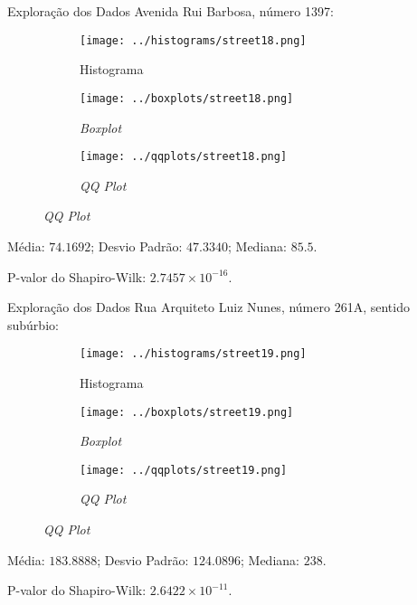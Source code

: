 \begin{frame}{Exploração dos Dados}
Avenida Rui Barbosa, número 1397:
\vskip 0.05cm
\begin{figure}
	\centering
	\begin{subfigure}{.33\textwidth}
		\centering
		\texttt{[image: ../histograms/street18.png]}
		\caption*{Histograma}
	\end{subfigure}%
	\begin{subfigure}{.33\textwidth}
		\centering
		\texttt{[image: ../boxplots/street18.png]}
		\caption*{\textit{Boxplot}}
	\end{subfigure}
	\begin{subfigure}{.32\textwidth}
		\centering
		\texttt{[image: ../qqplots/street18.png]}
		\caption*{\textit{QQ Plot}}
	\end{subfigure}
\end{figure}
\vskip 0.05cm
Média: $74.1692$; Desvio Padrão: $47.3340$; Mediana: $85.5$.

P-valor do Shapiro-Wilk: $2.7457 \times 10^{-16}$.
\end{frame}

\begin{frame}{Exploração dos Dados}
Rua Arquiteto Luiz Nunes, número 261A, sentido subúrbio:
\vskip 0.05cm
\begin{figure}
	\centering
	\begin{subfigure}{.33\textwidth}
		\centering
		\texttt{[image: ../histograms/street19.png]}
		\caption*{Histograma}
	\end{subfigure}%
	\begin{subfigure}{.33\textwidth}
		\centering
		\texttt{[image: ../boxplots/street19.png]}
		\caption*{\textit{Boxplot}}
	\end{subfigure}
	\begin{subfigure}{.32\textwidth}
		\centering
		\texttt{[image: ../qqplots/street19.png]}
		\caption*{\textit{QQ Plot}}
	\end{subfigure}
\end{figure}
\vskip 0.05cm
Média: $183.8888$; Desvio Padrão: $124.0896$; Mediana: $238$.

P-valor do Shapiro-Wilk: $2.6422 \times 10^{-11}$.
\end{frame}

